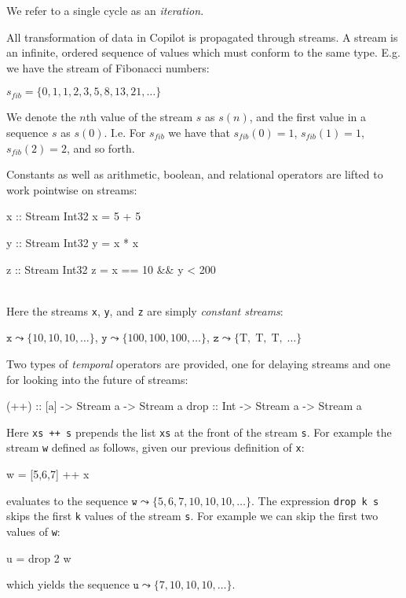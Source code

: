 \documentclass[]{article}
\theoremstyle{example}
\begin{document}
\noindent We refer to a single cycle as an \emph{iteration}.

All transformation of data in Copilot is propagated through streams.
A stream is an infinite, ordered sequence of values which must conform to the same type.
E.g. we have the stream of Fibonacci numbers:

\begin{center}
$s_{fib} = \{0, 1, 1, 2, 3, 5, 8, 13, 21, \dots \}$
\end{center}

\noindent We denote the $n$th value of the stream $s$ as $s(n)$, and the first
value in a sequence $s$ as $s(0)$. I.e. For $s_{fib}$ we have that $s_{fib}(0) = 1$,
$s_{fib}(1) = 1$, $s_{fib}(2) = 2$, and so forth.

Constants as well as arithmetic, boolean, and relational operators are
lifted to work pointwise on streams:
\\

\noindent
\begin{minipage}{0.3\textwidth}
\begin{code}
x :: Stream Int32
x = 5 + 5
\end{code}
\end{minipage}
\begin{minipage}{0.3\textwidth}
\begin{code}
y :: Stream Int32
y = x * x
\end{code}
\end{minipage}
\begin{minipage}{0.3\textwidth}
\begin{code}
z :: Stream Int32
z = x == 10 && y < 200
\end{code}
\end{minipage}
\\

\noindent Here the streams {\tt x}, {\tt y}, and {\tt z} are simply
\emph{constant streams}:

\begin{center}
$\mathtt{x} \leadsto \{10, 10, 10, \dots \}$,
$\mathtt{y} \leadsto \{100, 100, 100,  \dots \}$,
$\mathtt{z} \leadsto \{\mbox{T},\; \mbox{T},\; \mbox{T},\; \dots \}$
\end{center}

Two types of \emph{temporal} operators are provided, one for delaying streams and one for
looking into the future of streams:
%
\begin{code}
(++) :: [a] -> Stream a -> Stream a
drop :: Int -> Stream a -> Stream a
\end{code}
%
Here {\tt xs ++ s} prepends the list {\tt xs} at the front of the stream {\tt s}.
For example the stream {\tt w} defined as follows, given our previous definition
of {\tt x}:
%
\begin{code}
w = [5,6,7] ++ x
\end{code}
%
evaluates to the sequence
$\mathtt{w} \leadsto \{5, 6, 7, 10, 10, 10, \dots\}$.
The expression {\tt drop k s} skips the first {\tt k} values of the stream {\tt s}.
For example we can skip the first two values of {\tt w}:
%
\begin{code}
u = drop 2 w
\end{code}
%
which yields the sequence
$\mathtt{u} \leadsto \{7, 10, 10, 10, \dots\}$.
\end{document}
